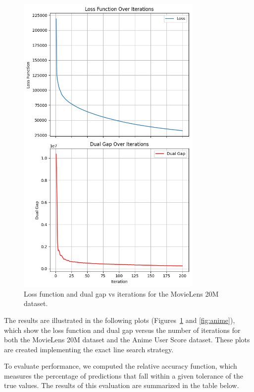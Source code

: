 \documentclass[a4paper, 11pt, reqno]{article} %
\begin{document}
\begin{multicols}{2}
\begin{figure}[H]
    \centering
    \includegraphics[width=0.8\textwidth]{images/movielens_loss_gap}
    \caption{Loss function and dual gap vs iterations for the MovieLens 20M dataset.}
    \label{fig:movielens}
\end{figure}

The results are illustrated in the following plots (Figures~\ref{fig:movielens} and \ref{fig:anime}), which show the loss function and dual gap versus the number of iterations for both the MovieLens 20M dataset and the Anime User Score dataset. These plots are created implementing the exact line search strategy.

To evaluate performance, we computed the relative accuracy function, which measures the percentage of predictions that fall within a given tolerance of the true values. The results of this evaluation are summarized in the table below.


\end{multicols}
\end{document}
